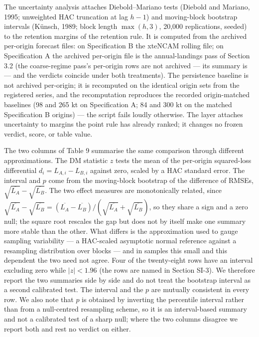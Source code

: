 \documentclass[11pt]{article}
\begin{document}
The uncertainty analysis attaches Diebold--Mariano tests (Diebold
and Mariano, 1995; unweighted HAC truncation at lag \(h-1\)) and
moving-block bootstrap intervals (K\"unsch, 1989; block length
\(\max(h,3)\), 20,000 replications, seeded) to the retention margins of
the retention rule. It is computed from the archived per-origin forecast
files: on Specification B the xteNCAM rolling file; on Specification A
the archived per-origin file is the annual-landings pass of Section 3.2
(the coarse-regime pass's per-origin rows are not archived --- its
summary is --- and the verdicts coincide under both treatments). The
persistence baseline is not archived per-origin; it is recomputed on the
identical origin sets from the registered series, and the recomputation
reproduces the recorded origin-matched baselines (98 and 265 kt on
Specification A; 84 and 300 kt on the matched Specification B origins)
--- the script fails loudly otherwise. The layer attaches uncertainty to
margins the point rule has already ranked; it changes no frozen verdict,
score, or table value.

The two columns of Table 9 summarise the same comparison through
different approximations. The DM statistic \(z\) tests the mean of the
per-origin squared-loss differential \(d_i = L_{A,i} - L_{B,i}\) against
zero, scaled by a HAC standard error. The interval and \(p\) come from
the moving-block bootstrap of the difference of RMSEs,
\(\sqrt{\overline{L_A}} - \sqrt{\overline{L_B}}\). The two effect
measures are monotonically related, since
\(\sqrt{\overline{L_A}}-\sqrt{\overline{L_B}} =
(\overline{L_A}-\overline{L_B})/(\sqrt{\overline{L_A}}+
\sqrt{\overline{L_B}})\), so they share a sign and a zero null; the
square root rescales the gap but does not by itself make one summary
more stable than the other. What differs is the approximation used to
gauge sampling variability --- a HAC-scaled asymptotic normal reference
against a resampling distribution over blocks --- and in samples this
small and this dependent the two need not agree. Four of the
twenty-eight rows have an interval excluding zero while \(|z| < 1.96\)
(the rows are named in Section SI-3). We therefore report the two
summaries side by side
and do not treat the bootstrap interval as a second calibrated test. The interval and the \(p\) are mutually
consistent in every row. We also note that \(p\) is obtained by
inverting the percentile interval rather than from a null-centred
resampling scheme, so it is an interval-based summary and not a
calibrated test of a sharp null; where the two columns disagree we
report both and rest no verdict on either.
\end{document}
